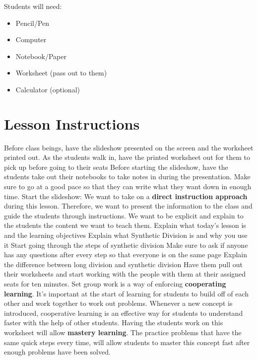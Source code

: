 Students will need:
\begin{itemize}
    \item Pencil/Pen
    \item Computer
    \item Notebook/Paper
    \item Worksheet (pass out to them)
    \item Calculator (optional)
\end{itemize}

\section{Lesson Instructions}

\begin{outline}
    \1 Before class beings, have the slideshow presented on the screen and the worksheet printed out.
    \1 As the students walk in, have the printed worksheet out for them to pick up before going to their seats
    \1 Before starting the slideshow, have the students take out their notebooks to take notes in during the presentation. Make sure to go at a good pace so that they can write what they want down in enough time. 
    \1 Start the slideshow: We want to take on a \textbf{direct instruction approach} during this lesson. Therefore, we want to present the information to the class and guide the students through instructions. We want to be explicit and explain to the students the content we want to teach them. 
        \2 Explain what today's lesson is and the learning objectives
        \2 Explain what Synthetic Division is and why you use it
        \2 Start going through the steps of synthetic division
            \3 Make sure to ask if anyone has any questions after every step so that everyone is on the same page
        \2 Explain the difference between long division and synthetic division
    \1 Have them pull out their worksheets and start working with the people with them at their assigned seats for ten minutes.
        \2 Set group work is a way of enforcing \textbf{cooperating learning}. It's important at the start of learning for students to build off of each other and work together to work out problems. Whenever a new concept is introduced, cooperative learning is an effective way for students to understand faster with the help of other students. 
        \2 Having the students work on this worksheet will allow \textbf{mastery learning}. The practice problems that have the same quick steps every time, will allow students to master this concept fast after enough problems have been solved.

\end{outline}
